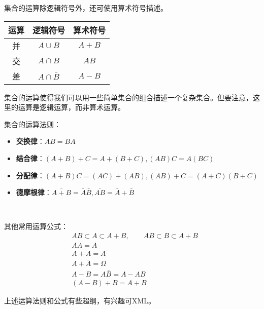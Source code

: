 集合的运算除逻辑符号外，还可使用算术符号描述。

\begin{table}[h]
\centering
\begin{tabular}{ccc}
    \toprule
    运算 & 逻辑符号 & 算术符号\\
    \midrule
    并 & $A\cup B$ & $A+B$\\
    交 & $A\cap B$ & $AB$\\
    差 & $A\cap \bar{B}$ & $A-B$\\
    \bottomrule
\end{tabular}
\end{table}

\begin{tcolorbox}
集合的运算使得我们可以用一些简单集合的组合描述一个复杂集合。但要注意，这里的运算是逻辑运算，而非算术运算。
\end{tcolorbox}

集合的运算法则：
\begin{itemize}
    \item {\bf 交换律}：$AB=BA$
    \item {\bf 结合律}：$\left( A+B \right) +C=A+\left( B+C \right) ,\left( AB \right) C=A\left( BC \right) $
    \item {\bf 分配律}：$\left( A+B \right) C=\left( AC \right) +\left( AB \right) ,\left( AB \right) +C=\left( A+C \right) \left( B+C \right) $
    \item {\bf 德摩根律}：$\overline{A+B}=\bar{A}\bar{B},\overline{AB}=\bar{A}+\bar{B}$
\end{itemize}

~

其他常用运算公式：
\begin{align*}
& AB\subset A\subset A+B,\qquad AB\subset B\subset A+B \\
& AA=A \\
& A+A=A \\
& A+\bar{A}=\varOmega \\
& A-B=A\bar{B}=A-AB \\
& \left( A-B \right) +B=A+B
\end{align*}

\begin{tcolorbox}
上述运算法则和公式有些超纲，有兴趣可XML。
\end{tcolorbox}





